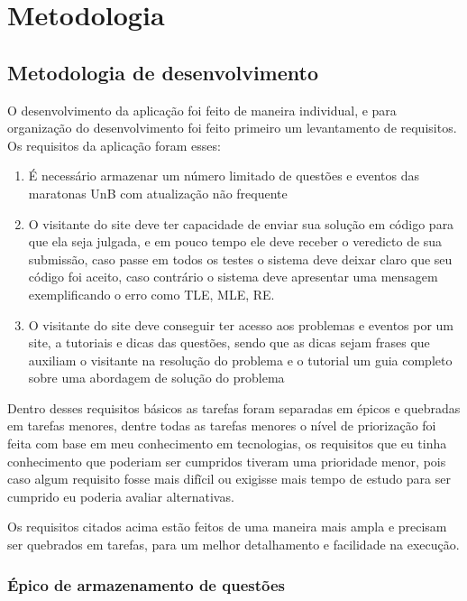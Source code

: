 \chapter[Metodologia]{Metodologia}

\section{Metodologia de desenvolvimento}

O desenvolvimento da aplicação foi feito de maneira individual, e para organização do desenvolvimento foi feito primeiro um levantamento de requisitos. Os requisitos da aplicação foram esses:
\begin{enumerate}

    \item É necessário armazenar um número limitado de questões e eventos das maratonas UnB com atualização não frequente
    \item O visitante do site deve ter capacidade de enviar sua solução em código para que ela seja julgada, e em pouco tempo ele deve receber o veredicto de sua submissão, caso passe em todos os testes o sistema deve deixar claro que seu código foi aceito, caso contrário o sistema deve apresentar uma mensagem exemplificando o erro como TLE, MLE, RE.
    \item O visitante do site deve conseguir ter acesso aos problemas e eventos por um site, a tutoriais e dicas das questões, sendo que as dicas sejam frases que auxiliam o visitante na resolução do problema e o tutorial um guia completo sobre uma abordagem de solução do problema
\end{enumerate}

Dentro desses requisitos básicos as tarefas foram separadas em épicos e quebradas em tarefas menores, dentre todas as tarefas menores o nível de priorização foi feita com base em meu conhecimento em tecnologias, os requisitos que eu tinha conhecimento que poderiam ser cumpridos tiveram uma prioridade menor, pois caso algum requisito fosse mais difĩcil ou exigisse mais tempo de estudo para ser cumprido eu poderia avaliar alternativas.

Os requisitos citados acima estão feitos de uma maneira mais ampla e precisam ser quebrados em tarefas, para um melhor detalhamento e facilidade na execução.

\subsection{Épico de armazenamento de questões}

